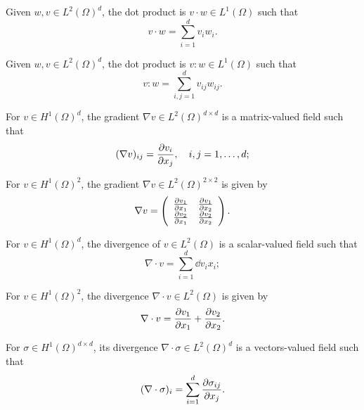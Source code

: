 \begin{definition}
  Given $w,v \in L^2(\Omega)^d$, the dot product is $v \cdot w \in L^1(\Omega)$ such that
  \begin{equation*}
    v \cdot w = \sum_{i=1}^d v_i w_i .
  \end{equation*}
\end{definition}
\begin{definition}
  Given $w,v \in L^2(\Omega)^d$, the dot product is $v : w \in L^1(\Omega)$ such that
  \begin{equation*}
    v : w = \sum_{i,j=1}^d v_{ij} w_{ij} .
  \end{equation*}
\end{definition}
\begin{definition}
  For $v \in H^1(\Omega)^d$, the gradient $\nabla v \in L^2(\Omega)^{d \times d}$ is a matrix-valued field such that
\begin{equation*}
  (\nabla v)_{ij} = \pp{v_i}{x_j}, \quad i,j = 1,\dots,d;
\end{equation*}
\end{definition}
\begin{corollary}
  For $v \in H^1(\Omega)^2$, the gradient $\nabla v \in L^2(\Omega)^{2 \times 2}$ is given by
\begin{equation*}
  \nabla v = \bmat{cc}
  \pp{v_1}{x_1} & \pp{v_1}{x_2} \\
  \pp{v_2}{x_1} & \pp{v_2}{x_2}
  \emat.
\end{equation*}
\end{corollary}
\begin{definition}
For $v \in H^1(\Omega)^d$, the divergence of $v \in L^2(\Omega)$ is a scalar-valued field such that
\begin{equation*}
  \nabla \cdot v = \sum_{i = 1}^d \dd{v_i}{x_i};
\end{equation*}
\end{definition}
\begin{corollary}
  For $v \in H^1(\Omega)^2$, the divergence $\nabla \cdot v \in L^2(\Omega)$ is given by
\begin{equation*}
  \nabla \cdot v = \pp{v_1}{x_1} + \pp{v_2}{x_2}.
\end{equation*}
\end{corollary}
\begin{definition}
For $\sigma \in H^1(\Omega)^{d \times d}$, its divergence $\nabla \cdot \sigma \in L^2(\Omega)^d$ is a vectors-valued field such that
\begin{equation*}
  (\nabla \cdot \sigma)_i = \sum_{i=1}^d \pp{\sigma_{ij}}{x_j}.
\end{equation*}
\end{definition}
